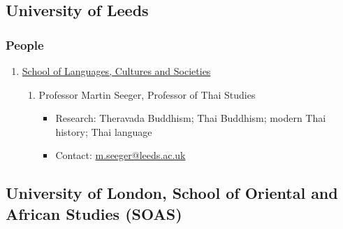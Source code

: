 \documentclass[a4paper,10.5pt]{article}
\begin{document}
\subsection{University of Leeds}
\label{sec:org9d33cdc}
\subsubsection{People}
\label{sec:org6b56c56}
\begin{enumerate}
\item \href{https://ahc.leeds.ac.uk/languages}{School of Languages, Cultures and Societies}
\label{sec:org950ddf3}
\begin{enumerate}
\item Professor Martin Seeger, Professor of Thai Studies
\label{sec:orgd22ac73}
\begin{itemize}
\item Research: Theravada Buddhism; Thai Buddhism; modern Thai history; Thai language\\
\item Contact: \href{mailto:m.seeger@leeds.ac.uk}{m.seeger@leeds.ac.uk}\\
\end{itemize}
\end{enumerate}
\end{enumerate}
\subsection{University of London, School of Oriental and African Studies (SOAS)}
\label{sec:org53b0a61}
\end{document}
